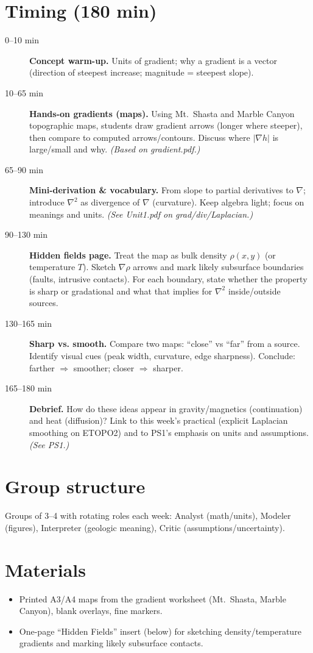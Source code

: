 \documentclass[11pt,a4paper]{article}
\begin{document}
\section*{Timing (180 min)}
\begin{description}
\item[0--10 min] \textbf{Concept warm-up.} Units of gradient; why a gradient is a vector (direction of steepest increase; magnitude = steepest slope).
\item[10--65 min] \textbf{Hands-on gradients (maps).} Using Mt.~Shasta and Marble Canyon topographic maps, students draw gradient arrows (longer where steeper), then compare to computed arrows/contours. Discuss where $|\nabla h|$ is large/small and why. \emph{(Based on gradient.pdf.)} \cite{gradient}
\item[65--90 min] \textbf{Mini-derivation \& vocabulary.} From slope to partial derivatives to $\nabla$; introduce $\nabla^2$ as divergence of $\nabla$ (curvature). Keep algebra light; focus on meanings and units. \emph{(See Unit1.pdf on grad/div/Laplacian.)} \cite{unit1}
\item[90--130 min] \textbf{Hidden fields page.} Treat the map as bulk density $\rho(x,y)$ (or temperature $T$). Sketch $\nabla \rho$ arrows and mark likely subsurface boundaries (faults, intrusive contacts). For each boundary, state whether the property is sharp or gradational and what that implies for $\nabla^2$ inside/outside sources.
\item[130--165 min] \textbf{Sharp vs. smooth.} Compare two maps: “close” vs “far” from a source. Identify visual cues (peak width, curvature, edge sharpness). Conclude: farther $\Rightarrow$ smoother; closer $\Rightarrow$ sharper.
\item[165--180 min] \textbf{Debrief.} How do these ideas appear in gravity/magnetics (continuation) and heat (diffusion)? Link to this week's practical (explicit Laplacian smoothing on ETOPO2) and to PS1's emphasis on units and assumptions. \emph{(See PS1.)} \cite{ps1}
\end{description}

\section*{Group structure}
Groups of 3--4 with rotating roles each week: Analyst (math/units), Modeler (figures), Interpreter (geologic meaning), Critic (assumptions/uncertainty).

\section*{Materials}
\begin{itemize}
  \item Printed A3/A4 maps from the gradient worksheet (Mt.~Shasta, Marble Canyon), blank overlays, fine markers. \cite{gradient}
  \item One-page “Hidden Fields” insert (below) for sketching density/temperature gradients and marking likely subsurface contacts.
\end{itemize}
\end{document}
